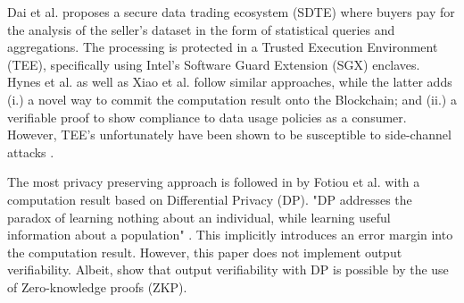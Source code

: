Dai et al. proposes a secure data trading ecosystem (SDTE) \cite{daiSDTESecureBlockchainBased2020} where buyers pay for the analysis of the seller’s dataset in the form of statistical queries and aggregations. The processing is protected in a Trusted Execution Environment (TEE), specifically using Intel’s Software Guard Extension (SGX) enclaves. %
Hynes et al. \cite{hynesDemonstrationSterlingPrivacypreserving2018a} as well as Xiao et al. \cite{xiaoPrivacyGuardEnforcingPrivate2020} follow similar approaches, while the latter adds (i.) a novel way to commit the computation result onto the Blockchain; and (ii.) a verifiable proof to show compliance to data usage policies as a consumer. However, TEE's unfortunately have been shown to be susceptible to side-channel attacks \cite{brasserSoftwareGrandExposure,biondoGuardDilemmaEfficient}.

The most privacy preserving approach is followed in \cite{fotiouPrivacypreservingStatisticsMarketplace2021} by Fotiou et al. with a computation result based on Differential Privacy (DP). "DP addresses the paradox of learning nothing about an individual, while learning useful information about a population" \cite{tsaloliDifferentialPrivacyMeets}. This implicitly introduces an error margin into the computation result. However, this paper does not implement output verifiability. Albeit, \cite{narayanVerifiableDifferentialPrivacy2015,tsaloliDifferentialPrivacyMeets,koutsosAgoraPrivacyAwareData} show that output verifiability with DP is possible by the use of Zero-knowledge proofs (ZKP).